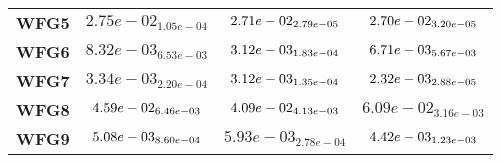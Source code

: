 \documentclass{article}
\begin{document}
\begin{table}[!htp]
\begin{scriptsize}
\begin{tabular}{c|ccc}
      \textbf{WFG5} & $2.75e-02_{1.05e-04} $ & $ \cellcolor{gray25} 2.71e-02_{2.79e-05} $ & $ \cellcolor{gray95} 2.70e-02_{3.20e-05}$ \\
      \textbf{WFG6} & $8.32e-03_{6.53e-03} $ & $ \cellcolor{gray95} 3.12e-03_{1.83e-04} $ & $ \cellcolor{gray25} 6.71e-03_{5.67e-03}$ \\
      \textbf{WFG7} & $3.34e-03_{2.20e-04} $ & $ \cellcolor{gray25} 3.12e-03_{1.35e-04} $ & $ \cellcolor{gray95} 2.32e-03_{2.88e-05}$ \\
      \textbf{WFG8} & $\cellcolor{gray25} 4.59e-02_{6.46e-03} $ & $ \cellcolor{gray95} 4.09e-02_{4.13e-03} $ & $ 6.09e-02_{3.16e-03}$ \\
      \textbf{WFG9} & $\cellcolor{gray25} 5.08e-03_{8.60e-04} $ & $ 5.93e-03_{2.78e-04} $ & $ \cellcolor{gray95} 4.42e-03_{1.23e-03}$ \\
  \end{tabular}
  \end{scriptsize}
\end{table}
\end{document}
